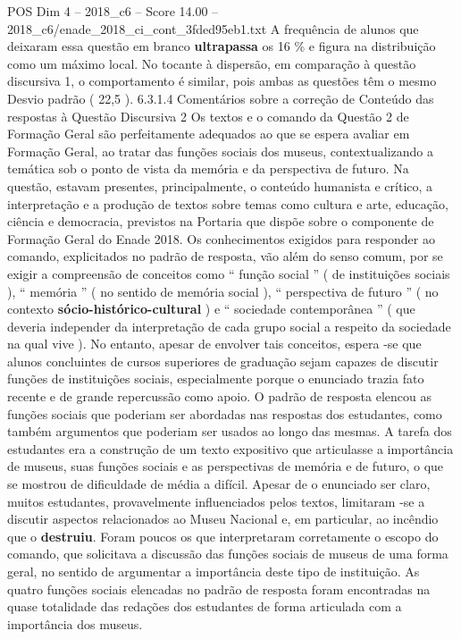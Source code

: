\begin{textsample}{POS Dim 4 – 2018\_c6 – Score 14.00 – 2018\_c6/enade\_2018\_ci\_cont\_3fded95eb1.txt}
A frequência de alunos que deixaram essa questão em branco \textbf{ultrapassa} os 16 \% e figura na distribuição como um máximo local.
No tocante à dispersão, em comparação à questão discursiva 1, o comportamento é similar, pois ambas as questões têm o mesmo Desvio padrão ( 22,5 ). 6.3.1.4 Comentários sobre a correção de Conteúdo das respostas à Questão Discursiva 2 Os textos e o comando da Questão 2 de Formação Geral são perfeitamente adequados ao que se espera avaliar em Formação Geral, ao tratar das funções sociais dos museus, contextualizando a temática sob o ponto de vista da memória e da perspectiva de futuro.
Na questão, estavam presentes, principalmente, o conteúdo humanista e crítico, a interpretação e a produção de textos sobre temas como cultura e arte, educação, ciência e democracia, previstos na Portaria que dispõe sobre o componente de Formação Geral do Enade 2018.
Os conhecimentos exigidos para responder ao comando, explicitados no padrão de resposta, vão além do senso comum, por se exigir a compreensão de conceitos como “ função social ” ( de instituições sociais ), “ memória ” ( no sentido de memória social ), “ perspectiva de futuro ” ( no contexto \textbf{sócio-histórico-cultural} ) e “ sociedade contemporânea ” ( que deveria independer da interpretação de cada grupo social a respeito da sociedade na qual vive ).
No entanto, apesar de envolver tais conceitos, espera -se que alunos concluintes de cursos superiores de graduação sejam capazes de discutir funções de instituições sociais, especialmente porque o enunciado trazia fato recente e de grande repercussão como apoio.
O padrão de resposta elencou as funções sociais que poderiam ser abordadas nas respostas dos estudantes, como também argumentos que poderiam ser usados ao longo das mesmas.
A tarefa dos estudantes era a construção de um texto expositivo que articulasse a importância de museus, suas funções sociais e as perspectivas de memória e de futuro, o que se mostrou de dificuldade de média a difícil.
Apesar de o enunciado ser claro, muitos estudantes, provavelmente influenciados pelos textos, limitaram -se a discutir aspectos relacionados ao Museu Nacional e, em particular, ao incêndio que o \textbf{destruiu}.
Foram poucos os que interpretaram corretamente o escopo do comando, que solicitava a discussão das funções sociais de museus de uma forma geral, no sentido de argumentar a importância deste tipo de instituição.
As quatro funções sociais elencadas no padrão de resposta foram encontradas na quase totalidade das redações dos estudantes de forma articulada com a importância dos museus.

\end{textsample}
